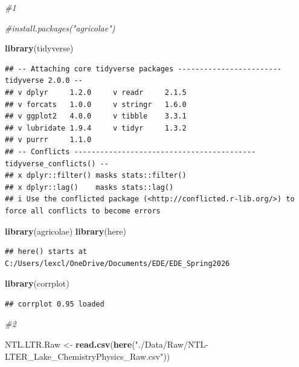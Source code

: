 \documentclass[
]{article}
\newenvironment{Shaded}{\begin{snugshade}}{\end{snugshade}}
\newcommand{\CommentTok}[1]{\textcolor[rgb]{0.56,0.35,0.01}{\textit{#1}}}
\newcommand{\FunctionTok}[1]{\textcolor[rgb]{0.13,0.29,0.53}{\textbf{#1}}}
\newcommand{\NormalTok}[1]{#1}
\newcommand{\OtherTok}[1]{\textcolor[rgb]{0.56,0.35,0.01}{#1}}
\newcommand{\StringTok}[1]{\textcolor[rgb]{0.31,0.60,0.02}{#1}}
\begin{document}
\begin{Shaded}
\begin{Highlighting}[]
\CommentTok{\#1}

\CommentTok{\#install.packages("agricolae")}

\FunctionTok{library}\NormalTok{(tidyverse)}
\end{Highlighting}
\end{Shaded}

\begin{verbatim}
## -- Attaching core tidyverse packages ------------------------ tidyverse 2.0.0 --
## v dplyr     1.2.0     v readr     2.1.5
## v forcats   1.0.0     v stringr   1.6.0
## v ggplot2   4.0.0     v tibble    3.3.1
## v lubridate 1.9.4     v tidyr     1.3.2
## v purrr     1.1.0     
## -- Conflicts ------------------------------------------ tidyverse_conflicts() --
## x dplyr::filter() masks stats::filter()
## x dplyr::lag()    masks stats::lag()
## i Use the conflicted package (<http://conflicted.r-lib.org/>) to force all conflicts to become errors
\end{verbatim}

\begin{Shaded}
\begin{Highlighting}[]
\FunctionTok{library}\NormalTok{(agricolae)}
\FunctionTok{library}\NormalTok{(here)}
\end{Highlighting}
\end{Shaded}

\begin{verbatim}
## here() starts at C:/Users/lexcl/OneDrive/Documents/EDE/EDE_Spring2026
\end{verbatim}

\begin{Shaded}
\begin{Highlighting}[]
\FunctionTok{library}\NormalTok{(corrplot)}
\end{Highlighting}
\end{Shaded}

\begin{verbatim}
## corrplot 0.95 loaded
\end{verbatim}

\begin{Shaded}
\begin{Highlighting}[]
\CommentTok{\#2}

\NormalTok{NTL.LTR.Raw }\OtherTok{\textless{}{-}} \FunctionTok{read.csv}\NormalTok{(}\FunctionTok{here}\NormalTok{(}\StringTok{"./Data/Raw/NTL{-}LTER\_Lake\_ChemistryPhysics\_Raw.csv"}\NormalTok{))}
\end{Highlighting}
\end{Shaded}
\end{document}

